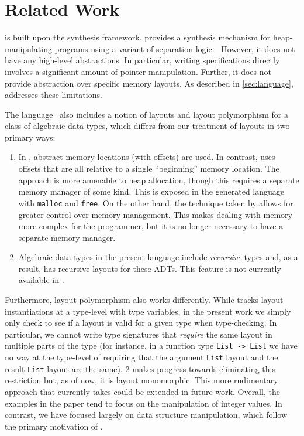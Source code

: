 \section{Related Work}
\label{sec:related-work}

\tool is built upon the \suslik synthesis framework. \suslik provides
a synthesis mechanism for heap-manipulating programs using a variant
of separation logic.~\cite{polikarpova:2019:suslik} However, it does
not have any high-level abstractions. In particular, writing \suslik
specifications directly involves a significant amount of pointer
manipulation. Further, it does not provide abstraction over specific
memory layouts. As described in \autoref{sec:language}, \tool
addresses these limitations.

The  language~\cite{chen:2023:dargent} also includes a
notion of layouts and layout polymorphism for a class of algebraic
data types, which differs from our treatment of layouts in two primary
ways:

\begin{enumerate}

\item In \tool, abstract memory locations (with offsets) are used. In
  contrast,  uses offsets that are all
  relative to a single ``beginning'' memory location. The \tool
  approach is more amenable to heap allocation, though
  this requires a separate memory manager of some kind. This is
  exposed in the generated language with \verb|malloc| and
  \verb|free|.
  On the other hand, the technique taken by  allows
  for greater control over memory management. This makes
  dealing with memory more complex for the programmer, but it is no
  longer necessary to have a separate memory manager.

  \item Algebraic data types in the present language include
    \emph{recursive} types and,
    as a result, \tool has recursive layouts for these ADTs. This
    feature is not currently available in .
  \end{enumerate}

Furthermore, layout polymorphism also works differently. While
 tracks layout instantiations at a type-level with type
variables, in the present work we simply only check to see if a layout
is valid for a given type when type-checking. In particular, we cannot
write type signatures that \textit{require} the same layout in
multiple parts of the type (for instance, in a function type
\verb|List -> List| we have no way at the type-level of requiring that
the argument \verb|List| layout and the result \verb|List| layout are
the same). \Pika{} 2 makes progress towards eliminating this restriction but, as of now, it is layout monomorphic. This more rudimentary approach that \tool currently takes
could be extended in future work.
%
Overall, the examples in the  paper tend to focus on
the manipulation of integer values. In contrast, we have focused
largely on data structure manipulation, which follow the primary
motivation of \suslik.

